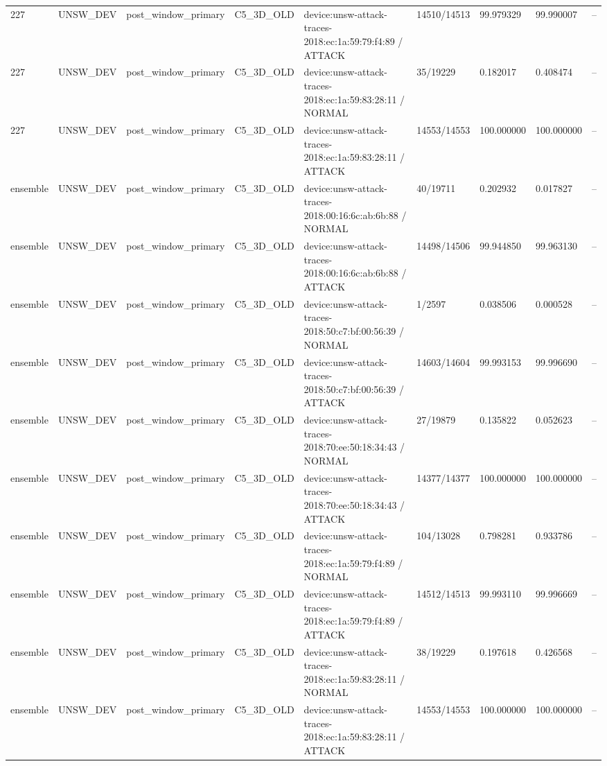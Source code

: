 \begin{tabular}{lllllllll}
227 & UNSW\_DEV & post\_window\_primary & C5\_3D\_OLD & device:unsw-attack-traces-2018:ec:1a:59:79:f4:89 / ATTACK & 14510/14513 & 99.979329 & 99.990007 & -- \\
227 & UNSW\_DEV & post\_window\_primary & C5\_3D\_OLD & device:unsw-attack-traces-2018:ec:1a:59:83:28:11 / NORMAL & 35/19229 & 0.182017 & 0.408474 & -- \\
227 & UNSW\_DEV & post\_window\_primary & C5\_3D\_OLD & device:unsw-attack-traces-2018:ec:1a:59:83:28:11 / ATTACK & 14553/14553 & 100.000000 & 100.000000 & -- \\
ensemble & UNSW\_DEV & post\_window\_primary & C5\_3D\_OLD & device:unsw-attack-traces-2018:00:16:6c:ab:6b:88 / NORMAL & 40/19711 & 0.202932 & 0.017827 & -- \\
ensemble & UNSW\_DEV & post\_window\_primary & C5\_3D\_OLD & device:unsw-attack-traces-2018:00:16:6c:ab:6b:88 / ATTACK & 14498/14506 & 99.944850 & 99.963130 & -- \\
ensemble & UNSW\_DEV & post\_window\_primary & C5\_3D\_OLD & device:unsw-attack-traces-2018:50:c7:bf:00:56:39 / NORMAL & 1/2597 & 0.038506 & 0.000528 & -- \\
ensemble & UNSW\_DEV & post\_window\_primary & C5\_3D\_OLD & device:unsw-attack-traces-2018:50:c7:bf:00:56:39 / ATTACK & 14603/14604 & 99.993153 & 99.996690 & -- \\
ensemble & UNSW\_DEV & post\_window\_primary & C5\_3D\_OLD & device:unsw-attack-traces-2018:70:ee:50:18:34:43 / NORMAL & 27/19879 & 0.135822 & 0.052623 & -- \\
ensemble & UNSW\_DEV & post\_window\_primary & C5\_3D\_OLD & device:unsw-attack-traces-2018:70:ee:50:18:34:43 / ATTACK & 14377/14377 & 100.000000 & 100.000000 & -- \\
ensemble & UNSW\_DEV & post\_window\_primary & C5\_3D\_OLD & device:unsw-attack-traces-2018:ec:1a:59:79:f4:89 / NORMAL & 104/13028 & 0.798281 & 0.933786 & -- \\
ensemble & UNSW\_DEV & post\_window\_primary & C5\_3D\_OLD & device:unsw-attack-traces-2018:ec:1a:59:79:f4:89 / ATTACK & 14512/14513 & 99.993110 & 99.996669 & -- \\
ensemble & UNSW\_DEV & post\_window\_primary & C5\_3D\_OLD & device:unsw-attack-traces-2018:ec:1a:59:83:28:11 / NORMAL & 38/19229 & 0.197618 & 0.426568 & -- \\
ensemble & UNSW\_DEV & post\_window\_primary & C5\_3D\_OLD & device:unsw-attack-traces-2018:ec:1a:59:83:28:11 / ATTACK & 14553/14553 & 100.000000 & 100.000000 & -- \\

\end{tabular}

